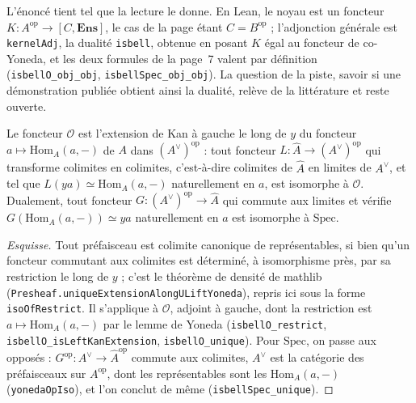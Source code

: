 L'énoncé tient tel que la lecture le donne. En Lean, le noyau est un foncteur $K : A^{\mathrm{op}} \to [C, \mathbf{Ens}]$, le cas de la page étant $C = B^{\mathrm{op}}$ ; l'adjonction générale est \texttt{kernelAdj}, la dualité \texttt{isbell}, obtenue en posant $K$ égal au foncteur de co-Yoneda, et les deux formules de la page~7 valent par définition (\texttt{isbellO\_obj\_obj}, \texttt{isbellSpec\_obj\_obj}). La question de la piste, savoir si une démonstration publiée obtient ainsi la dualité, relève de la littérature et reste ouverte.

\begin{encadre}
\begin{theoreme}
Le foncteur $\mathcal O$ est l'extension de Kan à gauche le long de $y$ du foncteur $a \mapsto \mathrm{Hom}_A(a, -)$ de $A$ dans $(A^\vee)^{\mathrm{op}}$ : tout foncteur $L : \widehat A \to (A^\vee)^{\mathrm{op}}$ qui transforme colimites en colimites, c'est-à-dire colimites de $\widehat A$ en limites de $A^\vee$, et tel que $L(ya) \simeq \mathrm{Hom}_A(a, -)$ naturellement en $a$, est isomorphe à $\mathcal O$. Dualement, tout foncteur $G : (A^\vee)^{\mathrm{op}} \to \widehat A$ qui commute aux limites et vérifie $G(\mathrm{Hom}_A(a, -)) \simeq ya$ naturellement en $a$ est isomorphe à $\mathrm{Spec}$.
\end{theoreme}
\end{encadre}

\begin{proof}[Esquisse]
Tout préfaisceau est colimite canonique de représentables, si bien qu'un foncteur commutant aux colimites est déterminé, à isomorphisme près, par sa restriction le long de $y$ ; c'est le théorème de densité de mathlib (\texttt{Presheaf.uniqueExtensionAlongULiftYoneda}), repris ici sous la forme \texttt{isoOfRestrict}. Il s'applique à $\mathcal O$, adjoint à gauche, dont la restriction est $a \mapsto \mathrm{Hom}_A(a, -)$ par le lemme de Yoneda (\texttt{isbellO\_restrict}, \texttt{isbellO\_isLeftKanExtension}, \texttt{isbellO\_unique}). Pour $\mathrm{Spec}$, on passe aux opposés : $G^{\mathrm{op}} : A^\vee \to \widehat A^{\mathrm{op}}$ commute aux colimites, $A^\vee$ est la catégorie des préfaisceaux sur $A^{\mathrm{op}}$, dont les représentables sont les $\mathrm{Hom}_A(a, -)$ (\texttt{yonedaOpIso}), et l'on conclut de même (\texttt{isbellSpec\_unique}).
\end{proof}

